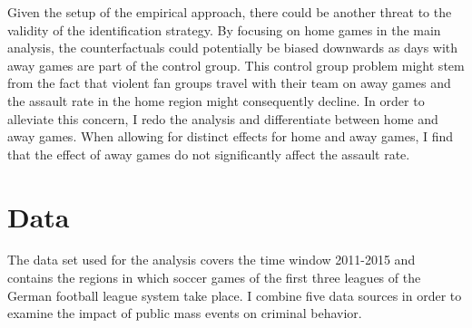 \documentclass[11pt, a4paper]{article} %
\begin{document}
Given the setup of the empirical approach, there could be another threat to the validity of the identification strategy. By focusing on home games in the main analysis, the counterfactuals could potentially be biased downwards as days with away games are part of the control group. This control group problem might stem from the fact that violent fan groups travel with their team on away games and the assault rate in the home region might consequently decline. In order to alleviate this concern, I redo the analysis and differentiate between home and away games. When allowing for distinct effects for home and away games, I find that the effect of away games do not significantly affect the assault rate. 








\bigskip
\section{Data}\label{sec_soc_ext:data} 
The data set used for the analysis covers the time window 2011-2015 and contains the regions in which soccer games of the first three leagues of the German football league system take place. I combine five data sources in order to examine the impact of public mass events on criminal behavior.
\end{document}
